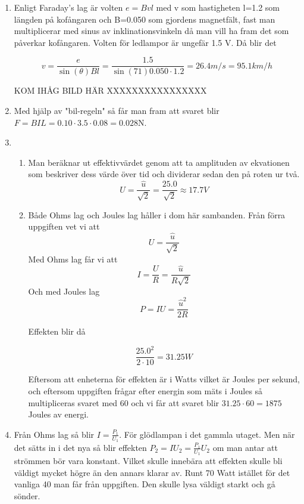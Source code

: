 \documentclass[a4paper,12pt]{article}
\begin{document}
\begin{enumerate}
      \item Enligt Faraday's lag är volten $e=Bvl$ med v som hastigheten
            l=1.2 som längden på kofångaren och B=0.050 som gjordens magnetfält,
            fast man multiplicerar med sinus av inklinationsvinkeln då
            man vill ha fram det som påverkar kofångaren.
            Volten för ledlampor är ungefär 1.5 V. Då blir det

            $$v=\frac{e}{\sin(\theta)Bl}=\frac{1.5}{\sin(71)0.050\cdot 1.2}=26.4m/s=95.1km/h$$

            KOM IHÅG BILD HÄR XXXXXXXXXXXXXXXX
      \item Med hjälp av "bil-regeln" så får man fram att
            svaret blir $F=BIL=0.10\cdot 3.5\cdot 0.08=0.028$N.

      \item
            \begin{enumerate}
                  \item Man beräknar ut effektivvärdet genom att
                        ta amplituden av ekvationen som beskriver dess värde över
                        tid och dividerar sedan den på roten ur två.
                        $$U=\frac{\hat{u}}{\sqrt{2}}=\frac{25.0}{\sqrt{2}}\approx 17.7V$$

                  \item Både Ohms lag och Joules lag håller i dom här sambanden.
                        Från förra uppgiften vet vi att $$U=\frac{\hat{u}}{\sqrt{2}}$$
                        Med Ohms lag får vi att $$I=\frac{U}{R}=\frac{\hat{u}}{R\sqrt{2}}$$
                        Och med Joules lag $$P=IU=\frac{\hat{u}^2}{2R}$$

                        Effekten blir då

                        $$\frac{25.0^2}{2\cdot 10}=31.25W$$

                        Eftersom att enheterna för effekten är i Watts vilket är Joules per sekund,
                        och eftersom uppgiften frågar efter energin som mäts i Joules så
                        multipliceras svaret med 60 och vi får att svaret blir $31.25\cdot 60=1 875$ Joules av energi.
            \end{enumerate}

      \item Från Ohms lag så blir $I=\frac{P_1}{U_1}$. För glödlampan i det gammla utaget.
            Men när det sätts in i det nya så blir effekten $P_2=IU_2=\frac{P_1}{U_1}U_2$ om man
            antar att strömmen bör vara konstant.
            Vilket skulle innebära att effekten skulle bli väldigt mycket högre än den annars klarar
            av. Runt 70 Watt istället för det vanliga 40 man får från uppgiften. Den skulle lysa
            väldigt starkt och gå sönder.


\end{enumerate}
\end{document}
